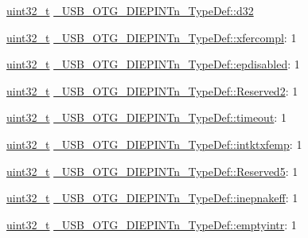 \begin{DoxyCompactItemize}
\begin{tabbing}
\end{tabbing}\item 
\hyperlink{stdint_8h_a435d1572bf3f880d55459d9805097f62}{uint32\-\_\-t} \hyperlink{group___u_s_b___o_t_g___d_r_i_v_e_r_ga99c655451b8e7c36e5cffe80238d8def}{\-\_\-\-U\-S\-B\-\_\-\-O\-T\-G\-\_\-\-D\-I\-E\-P\-I\-N\-Tn\-\_\-\-Type\-Def\-::d32}
\item 
\hyperlink{stdint_8h_a435d1572bf3f880d55459d9805097f62}{uint32\-\_\-t} \hyperlink{group___u_s_b___o_t_g___d_r_i_v_e_r_ga03b1ad5ac06af458fc8d10eee710ceb5}{\-\_\-\-U\-S\-B\-\_\-\-O\-T\-G\-\_\-\-D\-I\-E\-P\-I\-N\-Tn\-\_\-\-Type\-Def\-::xfercompl}\-: 1
\item 
\hyperlink{stdint_8h_a435d1572bf3f880d55459d9805097f62}{uint32\-\_\-t} \hyperlink{group___u_s_b___o_t_g___d_r_i_v_e_r_ga300352b16393687c3156329c5448b4b8}{\-\_\-\-U\-S\-B\-\_\-\-O\-T\-G\-\_\-\-D\-I\-E\-P\-I\-N\-Tn\-\_\-\-Type\-Def\-::epdisabled}\-: 1
\item 
\hyperlink{stdint_8h_a435d1572bf3f880d55459d9805097f62}{uint32\-\_\-t} \hyperlink{group___u_s_b___o_t_g___d_r_i_v_e_r_ga651638e82db2efdf3fa0b9c653008668}{\-\_\-\-U\-S\-B\-\_\-\-O\-T\-G\-\_\-\-D\-I\-E\-P\-I\-N\-Tn\-\_\-\-Type\-Def\-::\-Reserved2}\-: 1
\item 
\hyperlink{stdint_8h_a435d1572bf3f880d55459d9805097f62}{uint32\-\_\-t} \hyperlink{group___u_s_b___o_t_g___d_r_i_v_e_r_gaedd142332bb66001ab7d866e151c1950}{\-\_\-\-U\-S\-B\-\_\-\-O\-T\-G\-\_\-\-D\-I\-E\-P\-I\-N\-Tn\-\_\-\-Type\-Def\-::timeout}\-: 1
\item 
\hyperlink{stdint_8h_a435d1572bf3f880d55459d9805097f62}{uint32\-\_\-t} \hyperlink{group___u_s_b___o_t_g___d_r_i_v_e_r_gace8bd424f49bb9281260714fc42c035b}{\-\_\-\-U\-S\-B\-\_\-\-O\-T\-G\-\_\-\-D\-I\-E\-P\-I\-N\-Tn\-\_\-\-Type\-Def\-::intktxfemp}\-: 1
\item 
\hyperlink{stdint_8h_a435d1572bf3f880d55459d9805097f62}{uint32\-\_\-t} \hyperlink{group___u_s_b___o_t_g___d_r_i_v_e_r_ga57dcc37b8c90609671d6dfed1d8693c1}{\-\_\-\-U\-S\-B\-\_\-\-O\-T\-G\-\_\-\-D\-I\-E\-P\-I\-N\-Tn\-\_\-\-Type\-Def\-::\-Reserved5}\-: 1
\item 
\hyperlink{stdint_8h_a435d1572bf3f880d55459d9805097f62}{uint32\-\_\-t} \hyperlink{group___u_s_b___o_t_g___d_r_i_v_e_r_ga690132de792f85a88564f1792fee3765}{\-\_\-\-U\-S\-B\-\_\-\-O\-T\-G\-\_\-\-D\-I\-E\-P\-I\-N\-Tn\-\_\-\-Type\-Def\-::inepnakeff}\-: 1
\item 
\hyperlink{stdint_8h_a435d1572bf3f880d55459d9805097f62}{uint32\-\_\-t} \hyperlink{group___u_s_b___o_t_g___d_r_i_v_e_r_ga32d321f361625ca872c69633ba8d7147}{\-\_\-\-U\-S\-B\-\_\-\-O\-T\-G\-\_\-\-D\-I\-E\-P\-I\-N\-Tn\-\_\-\-Type\-Def\-::emptyintr}\-: 1

\end{DoxyCompactItemize}
